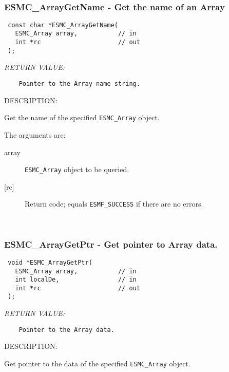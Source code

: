 \mbox{}\hrulefill\ 
 
\subsubsection [ESMC\_ArrayGetName] {ESMC\_ArrayGetName - Get the name of an Array}


  
\begin{verbatim} const char *ESMC_ArrayGetName(
   ESMC_Array array,           // in
   int *rc                     // out
 );\end{verbatim}{\em RETURN VALUE:}
\begin{verbatim}    Pointer to the Array name string.\end{verbatim}
{\sf DESCRIPTION:\\ }


  
    Get the name of the specified {\tt ESMC\_Array} object.
  
    The arguments are:
    \begin{description}
    \item[array] 
      {\tt ESMC\_Array} object to be queried.
    \item[{[rc]}]
      Return code; equals {\tt ESMF\_SUCCESS} if there are no errors.
    \end{description}
   
 
\mbox{}\hrulefill\ 
 
\subsubsection [ESMC\_ArrayGetPtr] {ESMC\_ArrayGetPtr - Get pointer to Array data.}


  
\begin{verbatim} void *ESMC_ArrayGetPtr(
   ESMC_Array array,           // in
   int localDe,                // in
   int *rc                     // out
 );\end{verbatim}{\em RETURN VALUE:}
\begin{verbatim}    Pointer to the Array data.\end{verbatim}
{\sf DESCRIPTION:\\ }


  
    Get pointer to the data of the specified {\tt ESMC\_Array} object.
  
